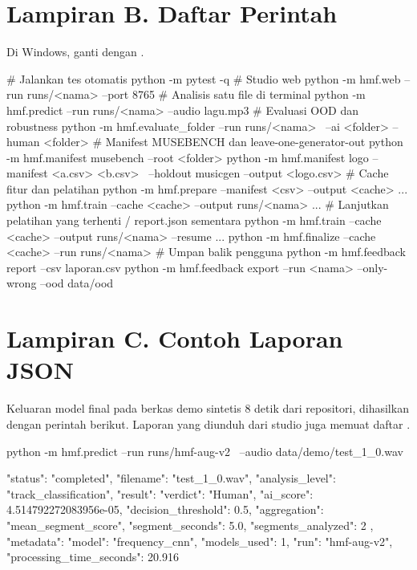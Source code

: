 \section*{Lampiran B. Daftar Perintah}
Di Windows, ganti  dengan .
\begin{Perintah}
# Jalankan tes otomatis
python -m pytest -q
# Studio web
python -m hmf.web --run runs/<nama> --port 8765
# Analisis satu file di terminal
python -m hmf.predict --run runs/<nama> --audio lagu.mp3
# Evaluasi OOD dan robustness
python -m hmf.evaluate_folder --run runs/<nama> \
    --ai <folder> --human <folder>
# Manifest MUSEBENCH dan leave-one-generator-out
python -m hmf.manifest musebench --root <folder>
python -m hmf.manifest logo --manifest <a.csv> <b.csv> \
    --holdout musicgen --output <logo.csv>
# Cache fitur dan pelatihan
python -m hmf.prepare --manifest <csv> --output <cache> ...
python -m hmf.train --cache <cache> --output runs/<nama> ...
# Lanjutkan pelatihan yang terhenti / report.json sementara
python -m hmf.train --cache <cache> --output runs/<nama> --resume ...
python -m hmf.finalize --cache <cache> --run runs/<nama>
# Umpan balik pengguna
python -m hmf.feedback report --csv laporan.csv
python -m hmf.feedback export --run <nama> --only-wrong --ood data/ood
\end{Perintah}

\section*{Lampiran C. Contoh Laporan JSON}
Keluaran model final pada berkas demo sintetis 8 detik dari repositori, dihasilkan dengan perintah berikut. Laporan yang diunduh dari studio juga memuat daftar .
\begin{Perintah}
python -m hmf.predict --run runs/hmf-aug-v2 \
    --audio data/demo/test_1_0.wav
\end{Perintah}
\begin{Perintah}
{
  "status": "completed",
  "filename": "test_1_0.wav",
  "analysis_level": "track_classification",
  "result": {
    "verdict": "Human",
    "ai_score": 4.514792272083956e-05,
    "decision_threshold": 0.5,
    "aggregation": "mean_segment_score",
    "segment_seconds": 5.0,
    "segments_analyzed": 2
  },
  "metadata": {
    "model": "frequency_cnn",
    "models_used": 1,
    "run": "hmf-aug-v2",
    "processing_time_seconds": 20.916
  }
}
\end{Perintah}

